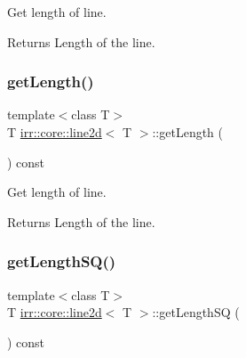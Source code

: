 Get length of line. 

\begin{DoxyReturn}{Returns}
Length of the line. 
\end{DoxyReturn}
\mbox{\label{classirr_1_1core_1_1line2d_a7322cb613e5e076ce6ff258e0f67dc0a}} 
\subsubsection{\texorpdfstring{get\+Length()}{getLength()}\hspace{0.1cm}{\footnotesize\ttfamily [2/2]}}
{\footnotesize\ttfamily template$<$class T$>$ \\
T \hyperlink{classirr_1_1core_1_1line2d}{irr\+::core\+::line2d}$<$ T $>$\+::get\+Length (\begin{DoxyParamCaption}{ }\end{DoxyParamCaption}) const\hspace{0.3cm}{\ttfamily [inline]}}



Get length of line. 

\begin{DoxyReturn}{Returns}
Length of the line. 
\end{DoxyReturn}
\mbox{\label{classirr_1_1core_1_1line2d_ab2e1b51af84b3f134a32ebb0b7e6968f}} 
\subsubsection{\texorpdfstring{get\+Length\+S\+Q()}{getLengthSQ()}\hspace{0.1cm}{\footnotesize\ttfamily [1/2]}}
{\footnotesize\ttfamily template$<$class T$>$ \\
T \hyperlink{classirr_1_1core_1_1line2d}{irr\+::core\+::line2d}$<$ T $>$\+::get\+Length\+SQ (\begin{DoxyParamCaption}{ }\end{DoxyParamCaption}) const\hspace{0.3cm}{\ttfamily [inline]}}



